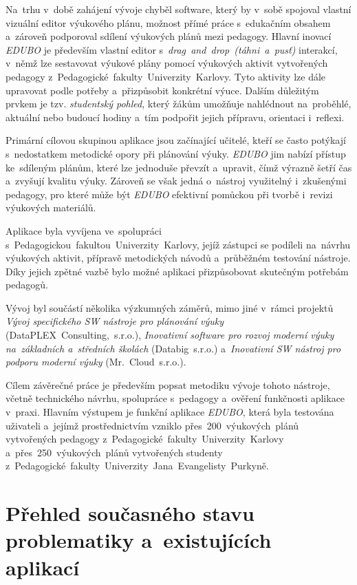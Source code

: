 \documentclass[male,czech,api_bc]{kitheses}
\begin{document}
Na~trhu v~době zahájení vývoje chyběl software, který by v~sobě spojoval vlastní vizuální editor výukového plánu, možnost přímé práce s~edukačním obsahem a~zároveň podporoval sdílení výukových plánů mezi pedagogy. Hlavní inovací \textit{EDUBO} je především vlastní editor s~\textit{drag~and~drop~(táhni~a~pusť)} interakcí, v~němž lze sestavovat výukové plány pomocí výukových aktivit vytvořených pedagogy z~Pedagogické~fakulty~Univerzity~Karlovy. Tyto aktivity lze dále upravovat podle potřeby a~přizpůsobit konkrétní výuce. Dalším důležitým prvkem je tzv. \textit{studentský pohled}, který žákům umožňuje nahlédnout na~proběhlé, aktuální nebo budoucí hodiny a~tím podpořit jejich přípravu, orientaci i~reflexi.

Primární cílovou skupinou aplikace jsou začínající učitelé, kteří se často potýkají s~nedostatkem metodické opory při plánování výuky. \textit{EDUBO} jim nabízí přístup ke~sdíleným plánům, které lze jednoduše převzít a~upravit, čímž výrazně šetří čas a~zvyšují kvalitu výuky. Zároveň se však jedná o~nástroj využitelný i~zkušenými pedagogy, pro které může být \textit{EDUBO} efektivní pomůckou při tvorbě i~revizi výukových materiálů.

Aplikace byla vyvíjena ve~spolupráci s~Pedagogickou~fakultou~Univerzity~Karlovy, jejíž zástupci se podíleli na~návrhu výukových aktivit, přípravě metodických návodů a~průběžném testování nástroje. Díky jejich zpětné vazbě bylo možné aplikaci přizpůsobovat skutečným potřebám pedagogů.

Vývoj byl součástí několika výzkumných záměrů, mimo jiné v~rámci projektů \textit{Vývoj specifického SW nástroje pro plánování výuky} (DataPLEX~Consulting,~s.r.o.), \textit{Inovativní software pro rozvoj moderní výuky na~základních a~středních školách} (Databig~s.r.o.) a~\textit{Inovativní SW nástroj pro podporu moderní výuky} (Mr.~Cloud~s.r.o.).

Cílem závěrečné práce je především popsat metodiku vývoje tohoto nástroje, včetně technického návrhu, spolupráce s~pedagogy a~ověření funkčnosti aplikace v~praxi. Hlavním výstupem je funkční aplikace \textit{EDUBO}, která byla testována uživateli a~jejímž prostřednictvím vzniklo přes~200~výukových~plánů vytvořených pedagogy z~Pedagogické~fakulty~Univerzity~Karlovy a~přes~250~výukových~plánů vytvořených studenty z~Pedagogické~fakulty~Univerzity~Jana~Evangelisty~Purkyně.

\chapter{Přehled současného stavu problematiky a~existujících aplikací}
\end{document}
